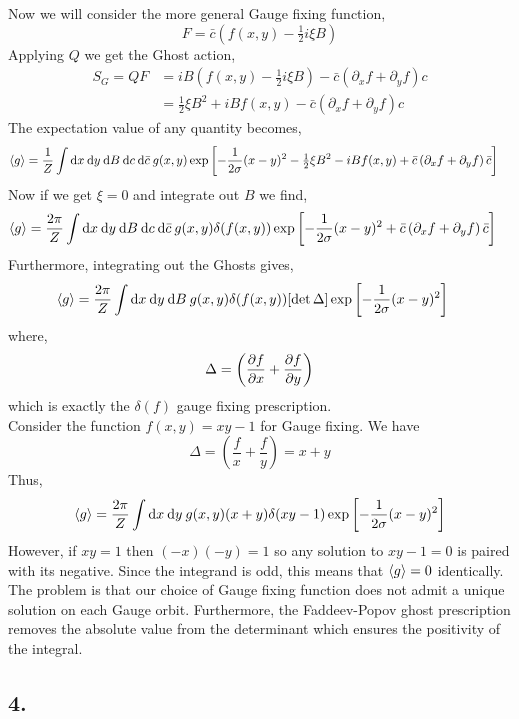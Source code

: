 \documentclass[12pt]{article}
\begin{document}
Now we will consider the more general Gauge fixing function,
\[ F = \bar{c} \left( f(x,y) - \tfrac{1}{2} i \xi B \right) \]
Applying $Q$ we get the Ghost action,
\begin{align*}
S_G = QF & = i B \left( f(x,y) - \tfrac{1}{2} i \xi B\right) -\bar{c} \left( \partial_x f + \partial_y f \right) c 
\\
& = \tfrac{1}{2} \xi B^2 + i B f(x,y) -\bar{c} \left( \partial_x f + \partial_y f \right) c 
\end{align*}
The expectation value of any quantity becomes,
\begin{align*}
\left< g \right> & = \frac{1}{Z} \int \mathrm{d}x \: \mathrm{d}y \: \mathrm{d}B \: \mathrm{d}c \: \mathrm{d}\bar{c} \: g(x,y) \exp{\left[ - \frac{1}{2 \sigma} (x - y)^2 - \tfrac{1}{2} \xi B^2 - i B f(x,y) + \bar{c} \left( \partial_x f + \partial_y f \right) \bar{c} \right]}
\end{align*}
Now if we get $\xi = 0$ and integrate out $B$ we find,
\begin{align*}
\left< g \right> & = \frac{2 \pi}{Z} \int \mathrm{d}x \: \mathrm{d}y \: \mathrm{d}B \: \mathrm{d}c \: \mathrm{d}\bar{c} \: g(x,y) \delta(f(x,y)) \exp{\left[ - \frac{1}{2 \sigma} (x - y)^2 + \bar{c} \left( \partial_x f + \partial_y f \right) \bar{c} \right]}
\end{align*}
Furthermore, integrating out the Ghosts gives,
\begin{align*}
\left< g \right> & = \frac{2 \pi}{Z} \int \mathrm{d}x \: \mathrm{d}y \: \mathrm{d}B \:  g(x,y) \delta(f(x,y))  [\det{\Delta}] \exp{\left[ - \frac{1}{2 \sigma} (x - y)^2 \right]}
\end{align*}
where,
\[ \Delta = \left( \frac{\partial{f}}{\partial{x}} + \frac{\partial{f}}{\partial{y}} \right) \]
which is exactly the $\delta(f)$ gauge fixing prescription. 
\bigskip\\
Consider the function $f(x,y) = xy - 1$ for Gauge fixing. We have 
\[ \Delta = \left( \frac{f}{x} + \frac{f}{y} \right) = x + y \]
Thus,
\[ \left< g \right> = \frac{2 \pi}{Z} \int \mathrm{d}x \: \mathrm{d}y \: g(x,y) (x + y) \delta(xy - 1) \exp{\left[ - \frac{1}{2 \sigma} (x - y)^2 \right]} \]
However, if $xy = 1$ then $(-x)(-y) = 1$ so any solution to $xy - 1 = 0$ is paired with its negative. Since the integrand is odd, this means that $\left< g \right> = 0$ identically. The problem is that our choice of Gauge fixing function does not admit a unique solution on each Gauge orbit. Furthermore, the Faddeev-Popov ghost prescription removes the absolute value from the determinant which ensures the positivity of the integral. 

\subsection*{4.}
\end{document}
